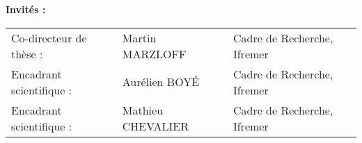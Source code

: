 {\vspace{\baselineskip}
{\normalTwelve \textbf{Invit\'{e}s :}}\\ \newline
\footnotesizeTwelve
\begin{tabular}{@{}lll}
Co-directeur de thèse :  & Martin MARZLOFF & Cadre de Recherche, Ifremer \\
Encadrant scientifique : & Aurélien BOY\'{E} & Cadre de Recherche, Ifremer \\
Encadrant scientifique : & Mathieu CHEVALIER & Cadre de Recherche, Ifremer \\

\end{tabular}
}


\maketitle
